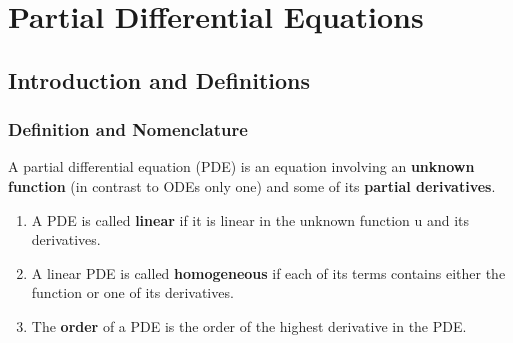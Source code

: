 \section{Partial Differential Equations}
%
%
%
\subsection{Introduction and Definitions}
%
%
\subsubsection{Definition and Nomenclature}
A partial differential equation (PDE) is an equation involving an \textbf{unknown function} (in contrast to ODEs only one) and some of its \textbf{partial derivatives}.
\begin{enumerate}
    \item A PDE is called \textbf{linear} if it is linear in the unknown function u and its derivatives.
    \item A linear PDE is called \textbf{homogeneous} if each of its terms contains either the function or one of its derivatives.
    \item The \textbf{order} of a PDE is the order of the highest derivative in the PDE.
\end{enumerate}
%
%
